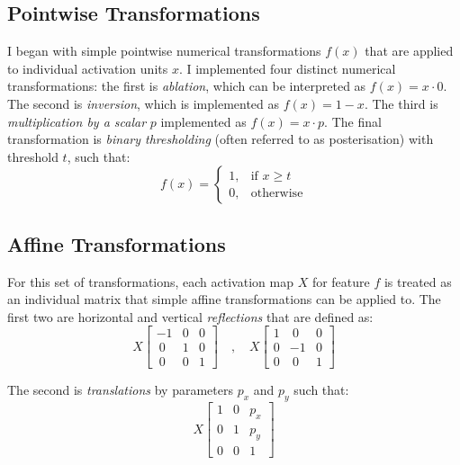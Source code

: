 \subsection{Pointwise Transformations}

I began with simple pointwise numerical transformations $f(x)$ that are applied to individual activation units $x$. 
I implemented four distinct numerical transformations: the first is \emph{ablation}, which can be interpreted as $f(x) = x \cdot 0$. 
The second is \emph{inversion}, which is implemented as $f(x) = 1 - x$. 
The third is \emph{multiplication by a scalar} $p$ implemented as $f(x) = x \cdot p$. 
The final transformation is \emph{binary thresholding} (often referred to  as posterisation) with threshold $t$, such that:
\begin{equation}
f(x) = \begin{cases}
    1,& \text{if  } x\geq t\\
    0,              & \text{otherwise}
\end{cases}
\end{equation}

\subsection{Affine Transformations}
\label{sec:affine}
For this set of transformations, each activation map $X$ for feature $f$ is treated as an individual matrix that simple affine transformations can be applied to. 
The first two are horizontal and vertical \emph{reflections} that are defined as:
\begin{equation}
X \begin{bmatrix}
-1 & 0 & 0\\
\ 0 & 1 & 0\\
\ 0 & 0 & 1
\end{bmatrix}\quad , \quad X \begin{bmatrix}
1 & \ 0 & 0\\
0 & -1 & 0\\
0 & \ 0 & 1
\end{bmatrix}
\end{equation}

\noindent The second is \emph{translations} by parameters $p_x$ and $p_y$ such that:
\begin{equation}
X \begin{bmatrix}
1 & 0 & p_x\\
0 & 1 & p_y\\
0 & 0 & 1
\end{bmatrix}
\end{equation}

